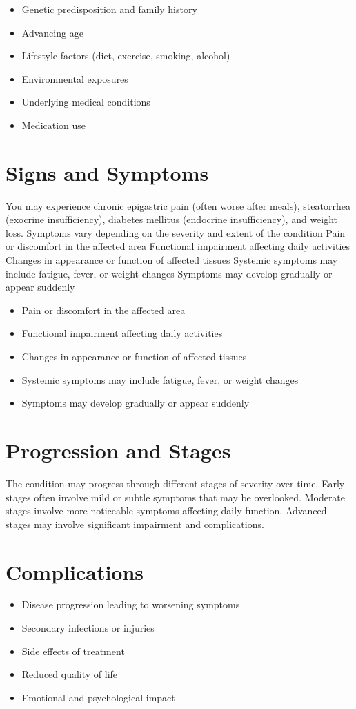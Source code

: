 \begin{itemize}[noitemsep]
  \item Genetic predisposition and family history
  \item Advancing age
  \item Lifestyle factors (diet, exercise, smoking, alcohol)
  \item Environmental exposures
  \item Underlying medical conditions
  \item Medication use
\end{itemize}
\section{Signs and Symptoms}
You may experience chronic epigastric pain (often worse after meals), steatorrhea (exocrine insufficiency), diabetes mellitus (endocrine insufficiency), and weight loss. Symptoms vary depending on the severity and extent of the condition Pain or discomfort in the affected area Functional impairment affecting daily activities Changes in appearance or function of affected tissues Systemic symptoms may include fatigue, fever, or weight changes Symptoms may develop gradually or appear suddenly

\begin{itemize}[noitemsep]
  \item Pain or discomfort in the affected area
  \item Functional impairment affecting daily activities
  \item Changes in appearance or function of affected tissues
  \item Systemic symptoms may include fatigue, fever, or weight changes
  \item Symptoms may develop gradually or appear suddenly
\end{itemize}
\section{Progression and Stages}
The condition may progress through different stages of severity over time. Early stages often involve mild or subtle symptoms that may be overlooked. Moderate stages involve more noticeable symptoms affecting daily function. Advanced stages may involve significant impairment and complications.
\section{Complications}
\begin{itemize}[noitemsep]
  \item Disease progression leading to worsening symptoms
  \item Secondary infections or injuries
  \item Side effects of treatment
  \item Reduced quality of life
  \item Emotional and psychological impact
\end{itemize}
